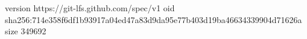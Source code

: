 version https://git-lfs.github.com/spec/v1
oid sha256:714e358f6df1b93917a04ed47a83d9da95e77b403d19ba46634339904d71626a
size 349692
